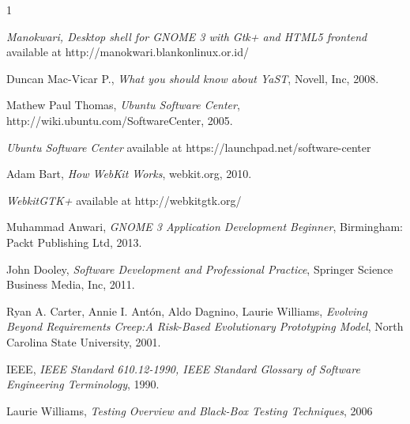 \documentclass[conference, letterpaper]{IEEEtran}
\begin{document}
%
%
%
\begin{thebibliography}
{1}

\emph{Manokwari, Desktop shell for GNOME 3 with Gtk+ and HTML5 frontend} available at http://manokwari.blankonlinux.or.id/

Duncan Mac-Vicar P., \emph{What you should know about YaST}, Novell, Inc, 2008.

Mathew Paul Thomas, \emph{Ubuntu Software Center}, http://wiki.ubuntu.com/SoftwareCenter, 2005.

\emph{Ubuntu Software Center} available at https://launchpad.net/software-center

Adam Bart, \emph{How WebKit Works}, webkit.org, 2010.

\emph{WebkitGTK+} available at http://webkitgtk.org/

Muhammad Anwari, \emph{GNOME 3 Application Development Beginner}, Birmingham: Packt Publishing Ltd, 2013.

John Dooley, \emph{Software Development and Professional Practice}, Springer Science Business Media, Inc, 2011.

Ryan A. Carter, Annie I. Antón, Aldo Dagnino, Laurie Williams, \emph{Evolving Beyond Requirements Creep:A Risk-Based Evolutionary Prototyping Model}, North Carolina State University, 2001.

IEEE, \emph{IEEE Standard 610.12-1990, IEEE Standard Glossary of Software Engineering Terminology}, 1990.

Laurie Williams, \emph{Testing Overview and Black-Box Testing Techniques}, 2006

\end{thebibliography}

\end{document}
